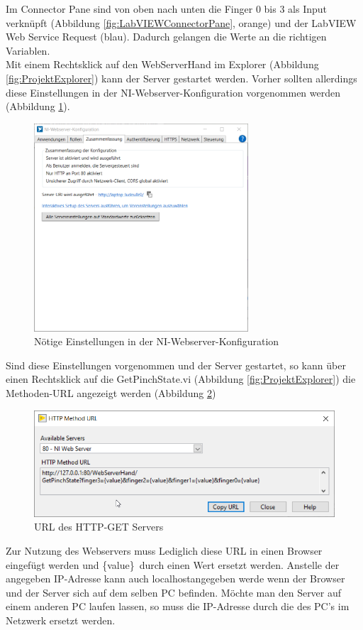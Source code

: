 \documentclass[a4paper,12pt,final]{article} %
\numberwithin{equation}{section} %
\numberwithin{figure}{section} %
\numberwithin{table}{section} %
\begin{document}
Im Connector Pane sind von oben nach unten die Finger 0 bis 3 als Input verknüpft (Abbildung \ref{fig:LabVIEWConnectorPane}, orange) und der LabVIEW Web Service Request (blau). 
Dadurch gelangen die Werte an die richtigen Variablen.\\
Mit einem Rechtsklick auf den WebServerHand im Explorer (Abbildung \ref{fig:ProjektExplorer}) kann der Server gestartet werden. Vorher sollten allerdings diese Einstellungen in der NI-Webserver-Konfiguration vorgenommen werden (Abbildung \ref{fig:EinstellungenWebServer}).
\begin{figure}[H]
	\begin{center}
		\includegraphics[width=8cm]{Bilder/Einstellungen-StartServerNeu.png}
		\caption{Nötige Einstellungen in der NI-Webserver-Konfiguration}
		\label{fig:EinstellungenWebServer}
	\end{center}
\end{figure}
Sind diese Einstellungen vorgenommen und der Server gestartet, so kann über einen Rechtsklick auf die GetPinchState.vi (Abbildung \ref{fig:ProjektExplorer}) die Methoden-URL angezeigt werden (Abbildung \ref{fig:HTTPMethod})
\begin{figure}[H]
	\begin{center}
		\includegraphics[width=12cm]{Bilder/HTTPMethod.png}
		\caption{URL des HTTP-GET Servers}
		\label{fig:HTTPMethod}
	\end{center}
\end{figure}
Zur Nutzung des Webservers muss Lediglich diese URL in einen Browser eingefügt werden und \glqq \{value\}\grqq\ durch einen Wert ersetzt werden.
Anstelle der angegeben IP-Adresse kann auch \glqq localhost\grqq angegeben werde wenn der Browser und der Server sich auf dem selben PC befinden.
Möchte man den Server auf einem anderen PC laufen lassen, so muss die IP-Adresse durch die des PC's im Netzwerk ersetzt werden.
\end{document}

